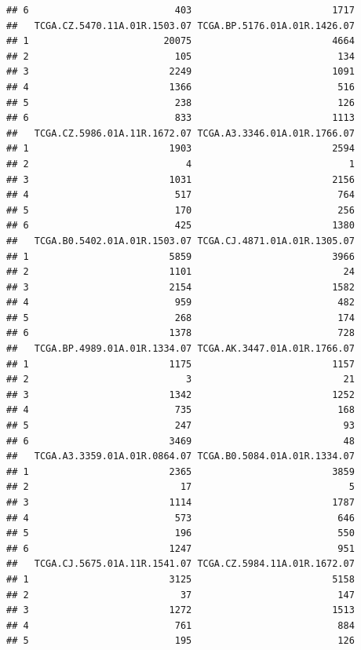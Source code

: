 \documentclass[
]{article}
\begin{document}
\begin{verbatim}
## 6                          403                         1717
##   TCGA.CZ.5470.11A.01R.1503.07 TCGA.BP.5176.01A.01R.1426.07
## 1                        20075                         4664
## 2                          105                          134
## 3                         2249                         1091
## 4                         1366                          516
## 5                          238                          126
## 6                          833                         1113
##   TCGA.CZ.5986.01A.11R.1672.07 TCGA.A3.3346.01A.01R.1766.07
## 1                         1903                         2594
## 2                            4                            1
## 3                         1031                         2156
## 4                          517                          764
## 5                          170                          256
## 6                          425                         1380
##   TCGA.B0.5402.01A.01R.1503.07 TCGA.CJ.4871.01A.01R.1305.07
## 1                         5859                         3966
## 2                         1101                           24
## 3                         2154                         1582
## 4                          959                          482
## 5                          268                          174
## 6                         1378                          728
##   TCGA.BP.4989.01A.01R.1334.07 TCGA.AK.3447.01A.01R.1766.07
## 1                         1175                         1157
## 2                            3                           21
## 3                         1342                         1252
## 4                          735                          168
## 5                          247                           93
## 6                         3469                           48
##   TCGA.A3.3359.01A.01R.0864.07 TCGA.B0.5084.01A.01R.1334.07
## 1                         2365                         3859
## 2                           17                            5
## 3                         1114                         1787
## 4                          573                          646
## 5                          196                          550
## 6                         1247                          951
##   TCGA.CJ.5675.01A.11R.1541.07 TCGA.CZ.5984.11A.01R.1672.07
## 1                         3125                         5158
## 2                           37                          147
## 3                         1272                         1513
## 4                          761                          884
## 5                          195                          126

\end{verbatim}
\end{document}
